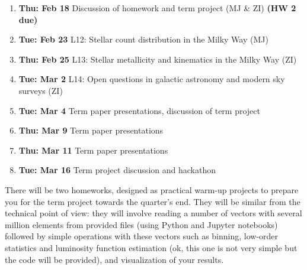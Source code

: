 \documentclass[10pt]{article}
\begin{document}
\begin{enumerate}
  \item {\bf Thu: Feb 18}  Discussion of homework and term project (MJ \& ZI) {\bf (HW 2 due)}

  \item {\bf Tue: Feb 23}  L12: Stellar count distribution in the Milky Way (MJ)

  \item {\bf Thu: Feb 25}  L13: Stellar metallicity and kinematics in the Milky Way (ZI) 

  \item {\bf Tue: Mar 2}  L14: Open questions in galactic astronomy and modern sky surveys (ZI) 

  \item {\bf Tue: Mar 4}     Term paper presentations, discussion of term project  
  \item {\bf Thu: Mar 9}     Term paper presentations   
  \item {\bf Thu: Mar 11}   Term paper presentations 
  \item {\bf Tue: Mar 16}   Term project discussion and hackathon 
\end{enumerate}


\vskip 0.2in


There will be two homeworks, designed as practical warm-up projects to prepare you
for the term project towards the quarter's end. They will be similar from the technical 
point of view: they will involve reading a number of vectors with several million elements 
from provided files (using Python and Jupyter notebooks) followed by simple operations 
with these vectors such as binning, low-order statistics and luminosity function estimation
(ok, this one is not very simple but the code will be provided), and visualization of your results. 
\end{document}
